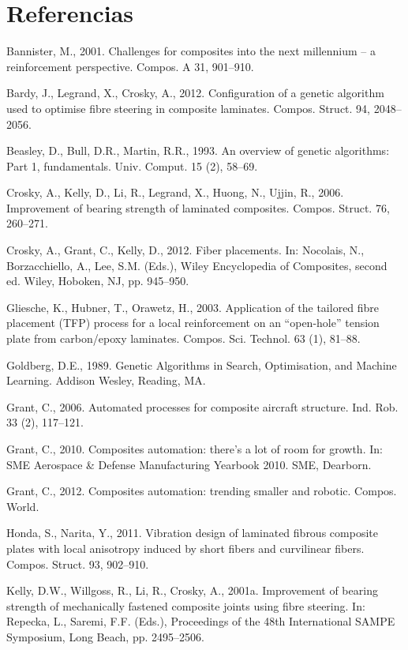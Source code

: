 \chapter{Referencias}
\label{Referencias}

Bannister, M., 2001. Challenges for composites into the next millennium – a reinforcement perspective. Compos. A 31, 901–910.

Bardy, J., Legrand, X., Crosky, A., 2012. Configuration of a genetic algorithm used to optimise fibre steering in composite laminates. Compos. Struct. 94, 2048–2056.

Beasley, D., Bull, D.R., Martin, R.R., 1993. An overview of genetic algorithms: Part 1, fundamentals. Univ. Comput. 15 (2), 58–69.

Crosky, A., Kelly, D., Li, R., Legrand, X., Huong, N., Ujjin, R., 2006. Improvement of bearing strength of laminated composites. Compos. Struct. 76, 260–271.

Crosky, A., Grant, C., Kelly, D., 2012. Fiber placements. In: Nocolais, N., Borzacchiello, A., Lee, S.M. (Eds.), Wiley Encyclopedia of Composites, second ed. Wiley, Hoboken, NJ, pp. 945–950.

Gliesche, K., Hubner, T., Orawetz, H., 2003. Application of the tailored fibre placement (TFP) process for a local reinforcement on an “open-hole” tension plate from carbon/epoxy laminates. Compos. Sci. Technol. 63 (1), 81–88.

Goldberg, D.E., 1989. Genetic Algorithms in Search, Optimisation, and Machine Learning. Addison Wesley, Reading, MA.

Grant, C., 2006. Automated processes for composite aircraft structure. Ind. Rob. 33 (2), 117–121.

Grant, C., 2010. Composites automation: there’s a lot of room for growth. In: SME Aerospace \& Defense Manufacturing Yearbook 2010. SME, Dearborn.

Grant, C., 2012. Composites automation: trending smaller and robotic. Compos. World.

Honda, S., Narita, Y., 2011. Vibration design of laminated fibrous composite plates with local anisotropy induced by short fibers and curvilinear fibers. Compos. Struct. 93, 902–910.

Kelly, D.W., Willgoss, R., Li, R., Crosky, A., 2001a. Improvement of bearing strength of mechanically fastened composite joints using fibre steering. In: Repecka, L., Saremi, F.F. (Eds.), Proceedings of the 48th International SAMPE Symposium, Long Beach, pp. 2495–2506.

